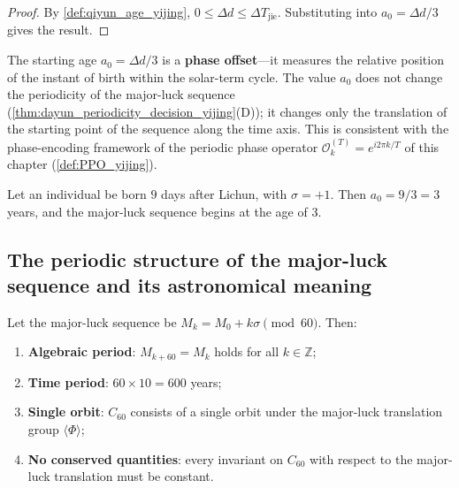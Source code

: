 \begin{proof}
By \cref{def:qiyun_age_yijing}, $0\le\Delta d\le\Delta T_{\text{jie}}$. Substituting into $a_0=\Delta d/3$ gives the result.
\end{proof}

\begin{remark}\label{rem:qiyun_phase_yijing}
The starting age $a_0=\Delta d/3$ is a \textbf{phase offset}---it measures the relative position of the instant of birth within the solar-term cycle. The value $a_0$ does not change the periodicity of the major-luck sequence (\cref{thm:dayun_periodicity_decision_yijing}(D)); it changes only the translation of the starting point of the sequence along the time axis. This is consistent with the phase-encoding framework of the periodic phase operator $\mathcal O_k^{(T)}=e^{i2\pi k/T}$ of this chapter (\cref{def:PPO_yijing}).
\end{remark}

\begin{example}\label{ex:qiyun_calc_yijing}
Let an individual be born $9$ days after Lichun, with $\sigma=+1$. Then $a_0=9/3=3$ years, and the major-luck sequence begins at the age of $3$.
\end{example}

\subsection{The periodic structure of the major-luck sequence and its astronomical meaning}

\begin{theorem}\label{thm:dayun_periodicity_yijing}
Let the major-luck sequence be $M_k=M_0+k\sigma\pmod{60}$. Then:
\begin{enumerate}[label=(\roman*)]
    \item \textbf{Algebraic period}: $M_{k+60}=M_k$ holds for all $k\in\mathbb Z$;
    \item \textbf{Time period}: $60\times 10=600$ years;
    \item \textbf{Single orbit}: $C_{60}$ consists of a single orbit under the major-luck translation group $\langle\Phi\rangle$;
    \item \textbf{No conserved quantities}: every invariant on $C_{60}$ with respect to the major-luck translation must be constant.
\end{enumerate}
\end{theorem}

